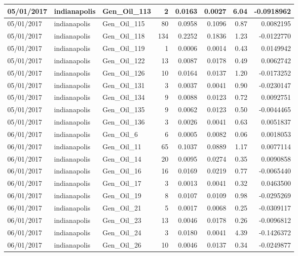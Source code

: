 \documentclass[
  letterpaper,
  DIV=11,
  numbers=noendperiod]{scrartcl}
\begin{document}
\begin{tabular}{l|l|l|r|r|r|r|r}
\hline
05/01/2017 & indianapolis & Gen\_Oil\_113 & 2 & 0.0163 & 0.0027 & 6.04 & -0.0918962\\
\hline
05/01/2017 & indianapolis & Gen\_Oil\_115 & 80 & 0.0958 & 0.1096 & 0.87 & 0.0082195\\
\hline
05/01/2017 & indianapolis & Gen\_Oil\_118 & 134 & 0.2252 & 0.1836 & 1.23 & -0.0122770\\
\hline
05/01/2017 & indianapolis & Gen\_Oil\_119 & 1 & 0.0006 & 0.0014 & 0.43 & 0.0149942\\
\hline
05/01/2017 & indianapolis & Gen\_Oil\_122 & 13 & 0.0087 & 0.0178 & 0.49 & 0.0062742\\
\hline
05/01/2017 & indianapolis & Gen\_Oil\_126 & 10 & 0.0164 & 0.0137 & 1.20 & -0.0173252\\
\hline
05/01/2017 & indianapolis & Gen\_Oil\_131 & 3 & 0.0037 & 0.0041 & 0.90 & -0.0230147\\
\hline
05/01/2017 & indianapolis & Gen\_Oil\_134 & 9 & 0.0088 & 0.0123 & 0.72 & 0.0092751\\
\hline
05/01/2017 & indianapolis & Gen\_Oil\_135 & 9 & 0.0062 & 0.0123 & 0.50 & -0.0044465\\
\hline
05/01/2017 & indianapolis & Gen\_Oil\_136 & 3 & 0.0026 & 0.0041 & 0.63 & 0.0051837\\
\hline
06/01/2017 & indianapolis & Gen\_Oil\_6 & 6 & 0.0005 & 0.0082 & 0.06 & 0.0018053\\
\hline
06/01/2017 & indianapolis & Gen\_Oil\_11 & 65 & 0.1037 & 0.0889 & 1.17 & 0.0077114\\
\hline
06/01/2017 & indianapolis & Gen\_Oil\_14 & 20 & 0.0095 & 0.0274 & 0.35 & 0.0090858\\
\hline
06/01/2017 & indianapolis & Gen\_Oil\_16 & 16 & 0.0169 & 0.0219 & 0.77 & -0.0065440\\
\hline
06/01/2017 & indianapolis & Gen\_Oil\_17 & 3 & 0.0013 & 0.0041 & 0.32 & 0.0463500\\
\hline
06/01/2017 & indianapolis & Gen\_Oil\_19 & 8 & 0.0107 & 0.0109 & 0.98 & -0.0295269\\
\hline
06/01/2017 & indianapolis & Gen\_Oil\_21 & 5 & 0.0017 & 0.0068 & 0.25 & -0.0309117\\
\hline
06/01/2017 & indianapolis & Gen\_Oil\_23 & 13 & 0.0046 & 0.0178 & 0.26 & -0.0096812\\
\hline
06/01/2017 & indianapolis & Gen\_Oil\_24 & 3 & 0.0180 & 0.0041 & 4.39 & -0.1426372\\
\hline
06/01/2017 & indianapolis & Gen\_Oil\_26 & 10 & 0.0046 & 0.0137 & 0.34 & -0.0249877\\

\end{tabular}
\end{document}
